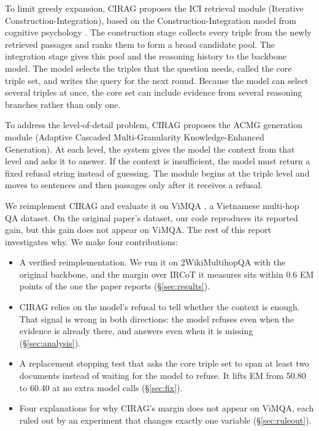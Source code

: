 \documentclass[11pt]{article}
\begin{document}
To limit greedy expansion, CIRAG proposes the ICI retrieval module (Iterative
Construction-Integration), based on the Construction-Integration model from cognitive
psychology \citep{kintsch1978ci}. The construction stage collects every triple from the
newly retrieved passages and ranks them to form a broad candidate pool. The integration
stage gives this pool and the reasoning history to the backbone model. The model selects
the triples that the question needs, called the core triple set, and writes the query for
the next round. Because the model can select several triples at once, the core set can
include evidence from several reasoning branches rather than only one.

To address the level-of-detail problem, CIRAG proposes the ACMG generation module (Adaptive
Cascaded Multi-Granularity Knowledge-Enhanced Generation). At each level, the system gives
the model the context from that level and asks it to answer. If the context is insufficient,
the model must return a fixed refusal string instead of guessing. The module begins at the
triple level and moves to sentences and then passages only after it receives a refusal.

We reimplement CIRAG and evaluate it on ViMQA \citep{le2022vimqa}, a Vietnamese multi-hop
QA dataset. On the original paper's dataset, our code reproduces its reported gain, but this
gain does not appear on ViMQA. The rest of this report investigates why. We make four
contributions:

\begin{itemize}
  \itemsep0.1em
  \item A verified reimplementation. We run it on 2WikiMultihopQA with the original
        backbone, and the margin over IRCoT it measures sits within 0.6 EM points of the one
        the paper reports (\S\ref{sec:results}).
  \item CIRAG relies on the model's refusal to tell whether the context is enough. That
        signal is wrong in both directions: the model refuses even when the evidence is
        already there, and answers even when it is missing (\S\ref{sec:analysis}).
  \item A replacement stopping test that asks the core triple set to span at least two
        documents instead of waiting for the model to refuse. It lifts EM from 50.80 to
        60.40 at no extra model calls (\S\ref{sec:fix}).
  \item Four explanations for why CIRAG's margin does not appear on ViMQA, each ruled out by
        an experiment that changes exactly one variable (\S\ref{sec:ruleout}).
\end{itemize}
\end{document}
